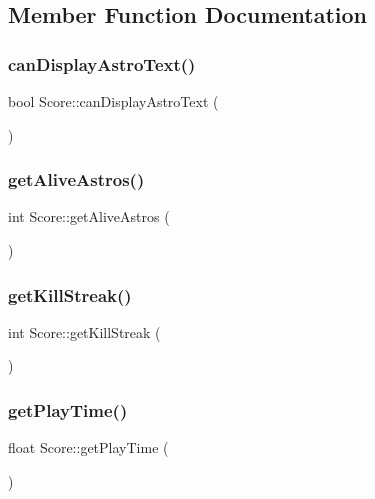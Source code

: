 \subsection{Member Function Documentation}
\mbox{\label{class_score_a915cd675992bb150fcd67b43f7b8732e}} 
\subsubsection{\texorpdfstring{can\+Display\+Astro\+Text()}{canDisplayAstroText()}}
{\footnotesize\ttfamily bool Score\+::can\+Display\+Astro\+Text (\begin{DoxyParamCaption}{ }\end{DoxyParamCaption})}

\mbox{\label{class_score_ad997fd059028945d10cfc8c056540a4f}} 
\subsubsection{\texorpdfstring{get\+Alive\+Astros()}{getAliveAstros()}}
{\footnotesize\ttfamily int Score\+::get\+Alive\+Astros (\begin{DoxyParamCaption}{ }\end{DoxyParamCaption})}

\mbox{\label{class_score_a3bd9796efe8e7cf9bb1c97597e56bc01}} 
\subsubsection{\texorpdfstring{get\+Kill\+Streak()}{getKillStreak()}}
{\footnotesize\ttfamily int Score\+::get\+Kill\+Streak (\begin{DoxyParamCaption}{ }\end{DoxyParamCaption})}

\mbox{\label{class_score_ae4fc66274baac2f13975f6139681b52c}} 
\subsubsection{\texorpdfstring{get\+Play\+Time()}{getPlayTime()}}
{\footnotesize\ttfamily float Score\+::get\+Play\+Time (\begin{DoxyParamCaption}{ }\end{DoxyParamCaption})}

